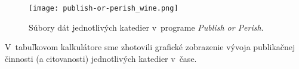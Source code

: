 \begin{figure}
  \centering
  \texttt{[image: publish-or-perish\_wine.png]}
  \caption{Súbory dát jednotlivých katedier v~programe \emph{Publish or
      Perish}.}
  \label{fig:pop.screenshot}
\end{figure}

V~tabuľkovom kalkulátore sme zhotovili grafické zobrazenie vývoja publikačnej
činnosti (a citovanosti) jednotlivých katedier v~čase.

